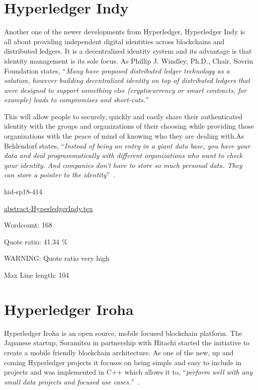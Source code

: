 \section{Hyperledger Indy}


Another one of the newer developments from Hyperledger, Hyperledger Indy 
is all about providing independent digital identities across blockchains 
and distributed ledgers. It is a decentralized identity system and its 
advantage is that identity management is its sole focus. 
As Phillip J. Windley, Ph.D., Chair, Sovrin Foundation states,  
\color{blue}``\emph{Many have proposed distributed ledger technology as a solution, 
however building decentralized identity on top of distributed ledgers 
that were designed to support something else (cryptocurrency or smart contracts, 
for example) leads to compromises and short-cuts.}''\color{black}~\cite{hid-sp18-414-Windley}

This will allow people to securely, quickly and easily share their authenticated 
identity with the groups and organizations of their choosing while providing those 
organizations with the peace of mind of knowing who they are dealing with.As Behlendorf 
states, \color{blue}``\emph{Instead of being an entry in a giant data base, you have your data and deal 
programmatically with different organizations who want to check your identity. And 
companies don’t have to store so much personal data. They can store a pointer to the 
identity}''\color{black}~\cite{hid-sp18-414-Behlendor}.


\begin{IU}

hid-sp18-414

\href{https://github.com/cloudmesh-community/hid-sp18-414/blob/master//technology/abstract-HyperledgerIndy.tex}{abstract-HyperledgerIndy.tex}

 

Wordcount: 168


Quote ratio: 41.34 \%

WARNING: Quote ratio very high
 
Max Line length: 104
\end{IU}

\section{Hyperledger Iroha}


Hyperledger Iroha is an open source, mobile focused blockchain
platform.  The Japanese startup, Soramitsu in partnership with Hitachi
started the initiative to create a mobile friendly blockchain
architecture. As one of the new, up and coming Hyperledger projects it
focuses on being simple and easy to include in projects and was
implemented in C++ which allows it to, \color{blue}``\emph{perform well with any small
data projects and focused use cases.}''\color{black}~\cite{hid-sp18-414-Behlendorf}.

